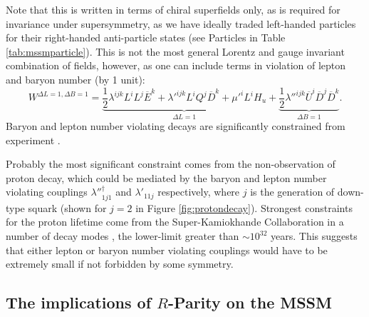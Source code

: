 Note that this is written in terms of chiral superfields only, as is required for invariance under supersymmetry, as we have ideally traded left-handed particles for their right-handed anti-particle states (see Particles in Table \ref{tab:mssmparticle}). This is not the most general Lorentz and gauge invariant combination of fields, however, as one can include terms in violation of lepton and baryon number (by 1 unit):
\begin{equation}
W^{\Delta L=1,\Delta B=1}=\underbrace{\frac{1}{2}\lambda^{ijk}L^{i}L^{j}\overline{E}^{k}+\lambda'^{ijk}L^{i}Q^{j}\overline{D}^{k}+\mu'^{i}L^{i}H_{u}}_{\Delta L=1}+\underbrace{\frac{1}{2}\lambda''^{ijk}\overline{U}^{i}\overline{D}^{j}\overline{D}^{k}}_{\Delta B=1}.
\label{eqn:Rpari}
\end{equation}
Baryon and lepton number violating decays are significantly constrained from experiment
\cite{RN538,RN539,RN540,RN541}.

Probably the most significant constraint comes from the non-observation of proton decay, which could be mediated by the baryon and lepton number violating couplings $\lambda''^{\dagger}_{1j1}$ and $\lambda'_{11j}$ respectively, where $j$ is the generation of down-type squark (shown for $j=2$ in Figure \ref{fig:protondecay}). Strongest constraints for the proton lifetime come from the Super-Kamiokhande Collaboration in a number of decay modes \cite{RN552}, the lower-limit greater than $\sim 10^{32}$ years. This suggests that either lepton or baryon number violating couplings would have to be extremely small if not forbidden by some symmetry.

\subsection{The implications of $R$-Parity on the MSSM}

